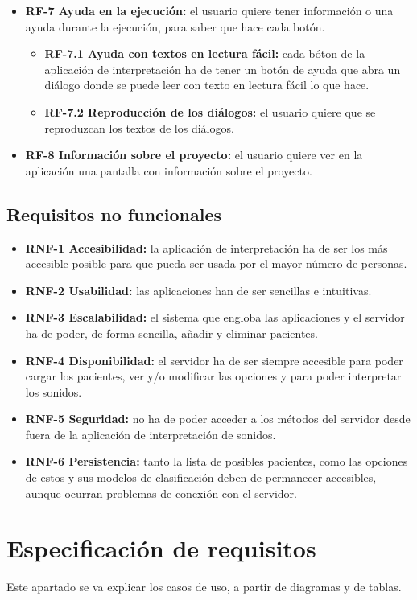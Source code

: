 \begin{itemize}
\begin{itemize}
	\end{itemize}
	\item \textbf{RF-7 Ayuda en la ejecución:} el usuario quiere tener información o una ayuda durante la ejecución, para saber que hace cada botón.
	\begin{itemize}
		\item \textbf{RF-7.1 Ayuda con textos en lectura fácil:} cada bóton de la aplicación de interpretación ha de tener un botón de ayuda que abra un diálogo donde se puede leer con texto en lectura fácil lo que hace.
		\item \textbf{RF-7.2 Reproducción de los diálogos:} el usuario quiere que se reproduzcan los textos de los diálogos.
	\end{itemize}
	\item \textbf{RF-8 Información sobre el proyecto:} el usuario quiere ver en la aplicación una pantalla con información sobre el proyecto.
\end{itemize}

\subsection{Requisitos no funcionales}
\begin{itemize}
	\item \textbf{RNF-1 Accesibilidad:} la aplicación de interpretación ha de ser los más accesible posible para que pueda ser usada por el mayor número de personas.
	\item \textbf{RNF-2 Usabilidad:} las aplicaciones han de ser sencillas e intuitivas.
	\item \textbf{RNF-3 Escalabilidad:} el sistema que engloba las aplicaciones y el servidor ha de poder, de forma sencilla, añadir y eliminar pacientes.
	\item \textbf{RNF-4 Disponibilidad:} el servidor ha de ser siempre accesible para poder cargar los pacientes, ver y/o modificar las opciones y para poder interpretar los sonidos.
	\item \textbf{RNF-5 Seguridad:} no ha de poder acceder a los métodos del servidor desde fuera de la aplicación de interpretación de sonidos.
	\item \textbf{RNF-6 Persistencia:} tanto la lista de posibles pacientes, como las opciones de estos y sus modelos de clasificación deben de permanecer accesibles, aunque ocurran problemas de conexión con el servidor.
\end{itemize}

\section{Especificación de requisitos}
Este apartado se va explicar los casos de uso, a partir de diagramas y de tablas.
